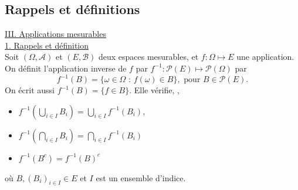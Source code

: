 \documentclass[8pt,notheorems]{beamer}
\theoremstyle{definition}
\theoremstyle{example}
\theoremstyle{mystyle}
\theoremstyle{plain}
\begin{document}
\subsection{Rappels et définitions}
\begin{frame}[allowframebreaks]

\underline{III. Applications mesurables}\\
\underline{1. Rappels et définition}\\
Soit $(\Omega,\mathcal{A})$ et $(E,\mathcal{B})$ deux espaces mesurables, et  $f:\Omega\mapsto E$ une application. On définit l'application inverse de $f$ par $f^{-1}:\mathcal{P}(E)\mapsto \mathcal{P}(\Omega)$ par 
$$
f^{-1}(B) = \{\omega\in\Omega\text{ : }f(\omega)\in B\},\text{ pour }B\in\mathcal{P}(E).
$$
On écrit aussi $f^{-1}(B) = \{f\in B\}$. Elle vérifie, ,
\begin{itemize}
\item 
$
f^{-1}\left(\bigcup_{i\in I}    B_i\right)=\bigcup_{i\in I}f^{-1}\left(B_i\right),
$
\item $f^{-1}\left(\bigcap_{i\in I}B_i\right)=\bigcap_{i\in I}f^{-1}\left(B_i\right)$
\item $f^{-1}(B^c) = f^{-1}(B)^c$
\end{itemize}
où $B, (B_i)_{i\in I}\in E$ et $I$ est un ensemble d'indice.
\end{frame}
\end{document}
